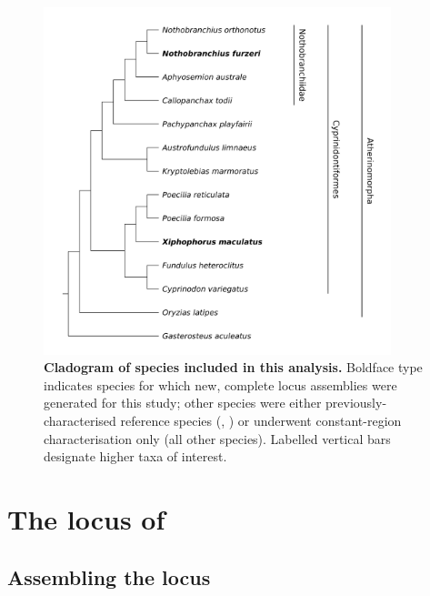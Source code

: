\begin{figure}
	\centering
	\includegraphics[width=0.9\textwidth]{_Figures/png/species-tree-large-taxa}
	\caption[Cladogram of analysed species]{\textbf{Cladogram of species included in this analysis.} Boldface type indicates species for which new, complete \igh{} locus assemblies were generated for this study; other species were either previously-characterised reference species (, ) or underwent constant-region characterisation only (all other species). Labelled vertical bars designate higher taxa of interest.}
	\label{fig:species-tree-large-taxa}
\end{figure}


\section{The \igh{} locus of \nfu}
\label{sec:nfu-locus}

\subsection{Assembling the \Nfu \igh{} locus}
\label{sec:nfu-locus-assembly}

